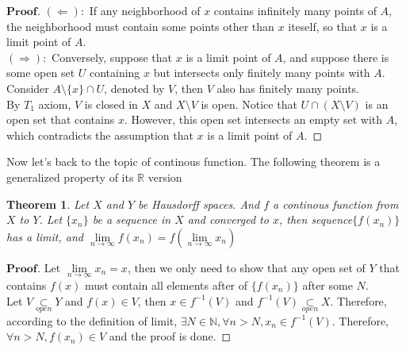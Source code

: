 \documentclass[a4paper, 11pt]{article}
\newtheorem{theorem}{Theorem}
\theoremstyle{definition}
\theoremstyle{remark}
\newenvironment{myprf}
{\renewcommand\qedsymbol{$ $}\begin{proof}[$\mathbf{Proof}$]}
  {\end{proof}}
\theoremstyle{definition}
\begin{document}
\begin{myprf}
        $(\Leftarrow):$ 
        If any neighborhood of $x$ contains infinitely many points of 
      $A$, the neighborhood must contain some points other than $x$ iteself, 
      so that $x$ is a limit point of $A$.\\
      $(\Rightarrow):$ Conversely, suppose that $x$ is a limit point of $A$, and
      suppose there is some open set $U$ containing $x$ but intersects only
      finitely many points with $A$. Consider $A\setminus\{x\}\cap U$, denoted
      by $V$, then $V$ also has finitely many points. \\
      \indent
      By $T_1$ axiom, $V$ 
      is closed in $X$ and $X\setminus V$ is open. Notice that $U\cap (X\setminus
      V)$ is an open set that contains $x$. However, this open set intersects
      an empty set with $A$, which contradicts the assumption 
      that $x$ is a limit point of $A$. 
\end{myprf}

Now let's back to the topic of continous function. The following theorem is
a generalized property of its $\mathbb{R}$ version

\begin{theorem}
       Let $X$ and $Y$ be Hausdorff spaces. And $f$ a continous function from
       $X$ to $Y$. Let $\{x_n\}$ be a sequence in $X$ and converged to $x$,
       then sequence$\{f(x_n)\}$ has a limit, and $\lim\limits_{n\to
       \infty} f(x_n)=f(\lim\limits_{n\to\infty}x_n)$
\end{theorem}

\begin{myprf}
        Let $\lim\limits_{n\to\infty}x_n=x$, then we only need to show that 
        any open set of $Y$ that contains $f(x)$ must contain all elements
        after of $\{f(x_n)\}$ after some $N$.\\
        \indent Let $V\underset{open}{\subset} Y$ and $f(x)\in V$, then $x
        \in f^{-1}(V)$ and $f^{-1}(V)\underset{open}{\subset} X$. Therefore,
        according to the definition of limit, $\exists N\in \mathbb{N},
        \forall n>N, x_n\in f^{-1}(V)$. Therefore, $\forall n>N,f(x_n)\in
        V$ and the proof is done.
\end{myprf}
\end{document}
